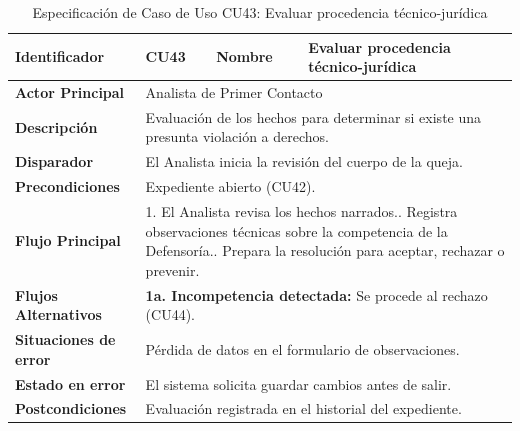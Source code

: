 \begingroup
\setlength{\parskip}{0pt}
\begin{longtable}{|p{3.5cm}|p{2cm}|p{2.5cm}|p{7cm}|}
\caption{Especificación de Caso de Uso CU43: Evaluar procedencia técnico-jurídica}
\label{tab:cu43} \\
\hline
\textbf{Identificador} & CU43 & \textbf{Nombre} & Evaluar procedencia técnico-jurídica \\ \hline
\textbf{Actor Principal} & \multicolumn{3}{p{11.5cm}|}{Analista de Primer Contacto} \\ \hline
\textbf{Descripción} & \multicolumn{3}{p{11.5cm}|}{Evaluación de los hechos para determinar si existe una presunta violación a derechos.} \\ \hline
\textbf{Disparador} & \multicolumn{3}{p{11.5cm}|}{El Analista inicia la revisión del cuerpo de la queja.} \\ \hline
\textbf{Precondiciones} & \multicolumn{3}{p{11.5cm}|}{Expediente abierto (CU42).} \\ \hline
\textbf{Flujo Principal} & \multicolumn{3}{p{11.5cm}|}{1. El Analista revisa los hechos narrados.\newline 2. Registra observaciones técnicas sobre la competencia de la Defensoría.\newline 3. Prepara la resolución para aceptar, rechazar o prevenir.} \\ \hline
\textbf{Flujos Alternativos} & \multicolumn{3}{p{11.5cm}|}{\textbf{1a. Incompetencia detectada:} Se procede al rechazo (CU44).} \\ \hline
\textbf{Situaciones de error} & \multicolumn{3}{p{11.5cm}|}{Pérdida de datos en el formulario de observaciones.} \\ \hline
\textbf{Estado en error} & \multicolumn{3}{p{11.5cm}|}{El sistema solicita guardar cambios antes de salir.} \\ \hline
\textbf{Postcondiciones} & \multicolumn{3}{p{11.5cm}|}{Evaluación registrada en el historial del expediente.} \\ \hline
\end{longtable}
\endgroup

\vspace{0.8cm}

